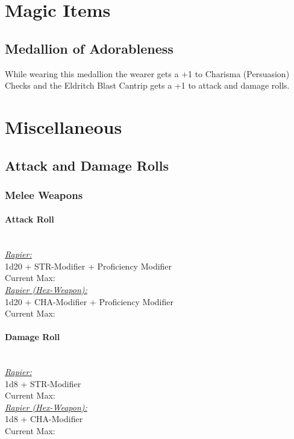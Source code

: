 {\section*{Magic Items}
\subsection*{Medallion of Adorableness}
While wearing this medallion the wearer gets a +1 to Charisma (Persuasion) Checks and the Eldritch Blast Cantrip gets a +1 to attack and damage rolls.

\vfill\eject
\section*{Miscellaneous}
\subsection*{Attack and Damage Rolls}
\subsubsection*{Melee Weapons}
\paragraph*{Attack Roll}\hfill\\
\underline{\textit{Rapier:}}\\
1d20 + STR-Modifier + Proficiency Modifier\\
\indent Current Max: \\
\underline{\textit{Rapier (Hex-Weapon):}}\\
1d20 + CHA-Modifier + Proficiency Modifier\\
\indent Current Max: 
\paragraph*{Damage Roll}\hfill\\
\underline{\textit{Rapier:}}\\
1d8 + STR-Modifier\\
\indent Current Max: \\
\underline{\textit{Rapier (Hex-Weapon):}}\\
1d8 + CHA-Modifier\\
\indent Current Max: 
}
